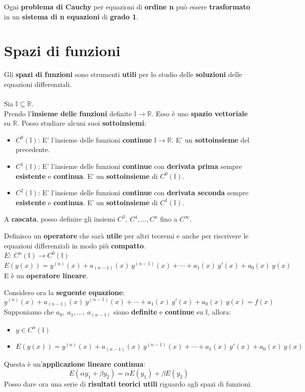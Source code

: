 \documentclass[a4paper, oneside]{article}
\newcommand\R{\mathbb{R}}
\newcommand\I{\mathbb{I}}
\begin{document}
    \noindent Ogni \textbf{problema di Cauchy} per equazioni di \textbf{ordine n} può essere \textbf{trasformato}
    in un \textbf{sistema di n equazioni} di \textbf{grado 1}.

    \newpage

    \section{Spazi di funzioni}
    Gli \textbf{spazi di funzioni} sono strumenti \textbf{utili} per lo studio delle \textbf{soluzioni} delle equazioni differenziali. \\\\
    \noindent Sia $\I\subseteq\R$.\\
    Prendo l'\textbf{insieme delle funzioni} definite $\I\to\R$. Esso è uno \textbf{spazio vettoriale} su $\R$. 
    Posso studiare alcuni suoi \textbf{sottoinsiemi}:
    \begin{itemize}
        \item $C^0(\I)$: E' l'insieme delle funzioni \textbf{continue} $\I\to\R$. E' un \textbf{sottoinsieme} del precedente. 
        \item $C^1(\I)$: E' l'insieme delle funzioni \textbf{continue} con \textbf{derivata prima} sempre \textbf{esistente} e \textbf{continua}. 
        E' un \textbf{sottoinsieme} di $C^0(\I)$.
        \item $C^2(\I)$: E' l'insieme delle funzioni \textbf{continue} con \textbf{derivata seconda} sempre \textbf{esistente} e \textbf{continua}. 
        E' un \textbf{sottoinsieme} di $C^1(\I)$.
    \end{itemize}
    A \textbf{cascata}, posso definire gli insiemi $C^3, \ C^4,\dots,C^n$ fino a $C^{\infty}$.

    \begin{definition}
        Definisco un \textbf{operatore} che sarà \textbf{utile} per altri teoremi e anche per riscrivere le equazioni differenziali in modo più \textbf{compatto}.\\
        $E: \ C^n(\I)\to C^0(\I)$\\
        $E\left(y(x)\right) = y^{(n)}(x) + a_{(n-1)}(x) \ y^{(n-1)}(x) + \cdots + a_1(x) \ y'(x) + a_0(x) \ y(x)$\\
        E è un \textbf{operatore lineare}.
    \end{definition}
        \noindent Considero ora la \textbf{seguente equazione}:
        \[y^{(n)}(x) + a_{(n-1)}(x) \ y^{(n-1)}(x) + \cdots + a_1(x) \ y'(x) + a_0(x) \ y(x) = f(x) \]
        Supponiamo che $a_0, \ a_1, \dots, \ a_{(n-1)}$ siano \textbf{definite} e \textbf{continue} su $\I$, allora:
        \begin{itemize}
            \item $y\in C^n(\I)$
            \item $E\left(y(x)\right) = y^{(n)}(x) + a_{(n-1)}(x) \ y^{(n-1)}(x) + \cdots + a_1(x) \ y'(x) + a_0(x) \ y(x)$
        \end{itemize}
        Questa è un'\textbf{applicazione lineare continua}:
        \[E\left(\alpha y_1 + \beta y_2\right) = \alpha E(y_1) + \beta E(y_2)\]
        Posso dare ora una serie di \textbf{risultati teorici utili} riguardo agli spazi di funzioni.
\end{document}
